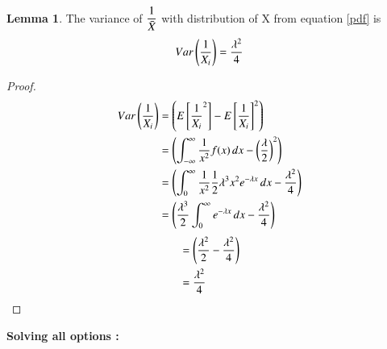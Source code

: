 \documentclass[journal,12pt,twocolumn]{IEEEtran}
\theoremstyle{definition}
\newtheorem{lemma}[theorem]{Lemma}
\begin{document}
\begin{lemma}
\label{varxi}
The variance of $ \dfrac{1}{\Bar{X}} $ with distribution of X from equation \eqref{pdf} is
\begin{align}
    Var\left(\dfrac{1}{X_i}\right) = \dfrac{\lambda^2}{4}
\end{align}
\end{lemma}
\begin{proof}
\begin{align}
  Var\left(\dfrac{1}{X_i}\right)   & = \left(E  \left[ {\dfrac{1}{X_i}}^2  \right] - {E  \left[ {\dfrac{1}{X_i}}  \right]}^2 \right) \\
    & =  \left( \int_{-\infty}^{\infty} \dfrac{1}{x^2} f(x)\,dx  - \left(\dfrac{\lambda}{2}\right)^2 \right) \\
    & =  \left( \int_{0}^{\infty} \dfrac{1}{x^2}  \dfrac{1}{2} \lambda^3x^2e^{-\lambda x} \,dx  - {\dfrac{\lambda^2}{4}} \right) \\
      & =  \left( \dfrac{\lambda^3}{2}\int_{0}^{\infty} e^{-\lambda x} \,dx  - {\dfrac{\lambda^2}{4}} \right)
      \end{align}
      \begin{align}
    & =   \left( {\dfrac{\lambda^2}{2}} - {\dfrac{\lambda^2}{4}} \right) \\
    &= \dfrac{\lambda^2}{4}
\end{align}
\end{proof}
\textbf{Solving all options : }
\end{document}
